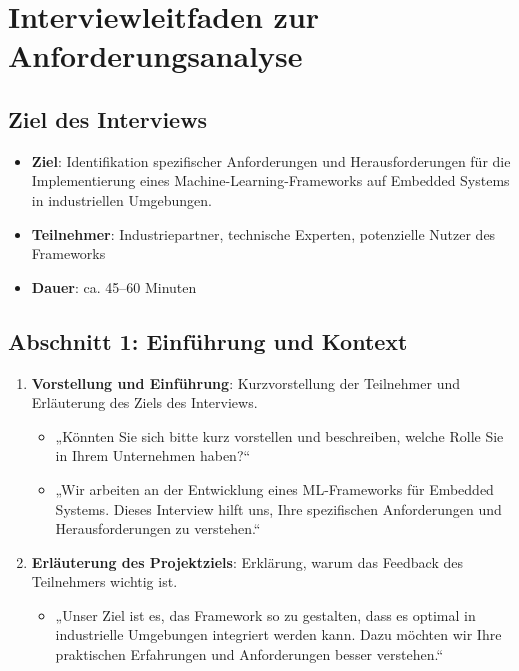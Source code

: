 \chapter{Interviewleitfaden zur Anforderungsanalyse}
\label{appendix:interviewleitfaden}

\section*{Ziel des Interviews}
\begin{itemize}
    \item \textbf{Ziel}: Identifikation spezifischer Anforderungen und Herausforderungen für die Implementierung eines Machine-Learning-Frameworks auf Embedded Systems in industriellen Umgebungen.
    \item \textbf{Teilnehmer}: Industriepartner, technische Experten, potenzielle Nutzer des Frameworks
    \item \textbf{Dauer}: ca. 45–60 Minuten
\end{itemize}

\section*{Abschnitt 1: Einführung und Kontext}
\begin{enumerate}
    \item \textbf{Vorstellung und Einführung}: Kurzvorstellung der Teilnehmer und Erläuterung des Ziels des Interviews.
    \begin{itemize}
        \item „Könnten Sie sich bitte kurz vorstellen und beschreiben, welche Rolle Sie in Ihrem Unternehmen haben?“
        \item „Wir arbeiten an der Entwicklung eines ML-Frameworks für Embedded Systems. Dieses Interview hilft uns, Ihre spezifischen Anforderungen und Herausforderungen zu verstehen.“
    \end{itemize}
    \item \textbf{Erläuterung des Projektziels}: Erklärung, warum das Feedback des Teilnehmers wichtig ist.
    \begin{itemize}
        \item „Unser Ziel ist es, das Framework so zu gestalten, dass es optimal in industrielle Umgebungen integriert werden kann. Dazu möchten wir Ihre praktischen Erfahrungen und Anforderungen besser verstehen.“
    \end{itemize}
\end{enumerate}

